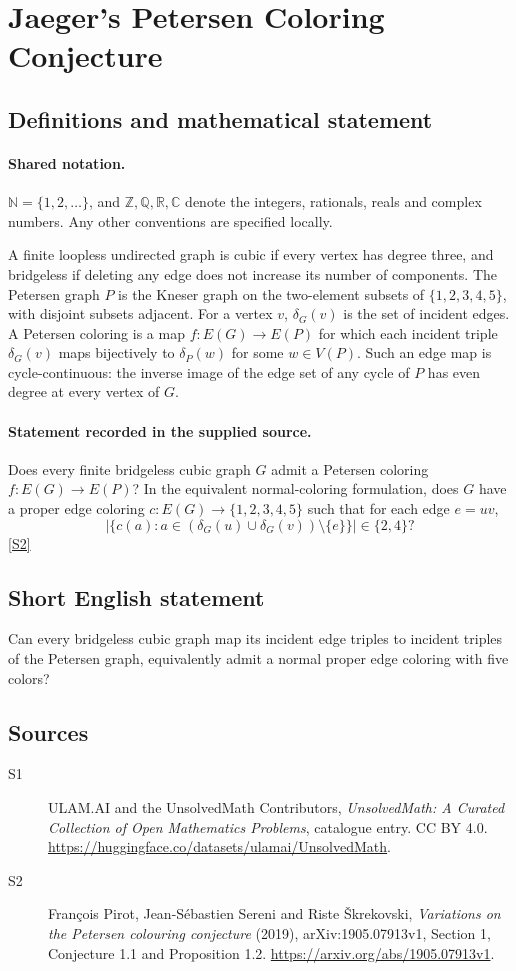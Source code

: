 \documentclass[11pt]{article}
\newcommand{\sref}[2]{\hyperlink{source:#1:#2}{[S#2]}}
\begin{document}
\section{Jaeger's Petersen Coloring Conjecture}\label{statement}

\subsection{Definitions and mathematical statement}

\paragraph{Shared notation.}$\mathbb N=\{1,2,\ldots\}$, and $\mathbb Z,\mathbb Q,\mathbb R,\mathbb C$ denote the integers, rationals, reals and complex numbers. Any other conventions are specified locally.


A finite loopless undirected graph is cubic if every vertex has degree three, and bridgeless if deleting any edge does not increase its number of components. The Petersen graph $P$ is the Kneser graph on the two-element subsets of $\{1,2,3,4,5\}$, with disjoint subsets adjacent. For a vertex $v$, $\delta_G(v)$ is the set of incident edges. A Petersen coloring is a map $f:E(G)\to E(P)$ for which each incident triple $\delta_G(v)$ maps bijectively to $\delta_P(w)$ for some $w\in V(P)$. Such an edge map is cycle-continuous: the inverse image of the edge set of any cycle of $P$ has even degree at every vertex of $G$.
\paragraph{Statement recorded in the supplied source.}
Does every finite bridgeless cubic graph $G$ admit a Petersen coloring $f:E(G)\to E(P)$? In the equivalent normal-coloring formulation, does $G$ have a proper edge coloring $c:E(G)\to\{1,2,3,4,5\}$ such that for each edge $e=uv$,
\[
 \left|\{c(a):a\in(\delta_G(u)\cup\delta_G(v))\setminus\{e\}\}\right|\in\{2,4\}?
\]
\sref{statement}{2}
\subsection{Short English statement}
Can every bridgeless cubic graph map its incident edge triples to incident triples of the Petersen graph, equivalently admit a normal proper edge coloring with five colors?
\subsection{Sources}
\begin{description}
\item[\hypertarget{source:statement:1}{S1}] ULAM.AI and the UnsolvedMath Contributors, \emph{UnsolvedMath: A Curated Collection of Open Mathematics Problems}, catalogue entry. CC BY 4.0. \url{https://huggingface.co/datasets/ulamai/UnsolvedMath}.
\item[\hypertarget{source:statement:2}{S2}] François Pirot, Jean-Sébastien Sereni and Riste Škrekovski, \emph{Variations on the Petersen colouring conjecture} (2019), arXiv:1905.07913v1, Section 1, Conjecture 1.1 and Proposition 1.2. \url{https://arxiv.org/abs/1905.07913v1}.
\end{description}
\label{end:statement}
\end{document}
